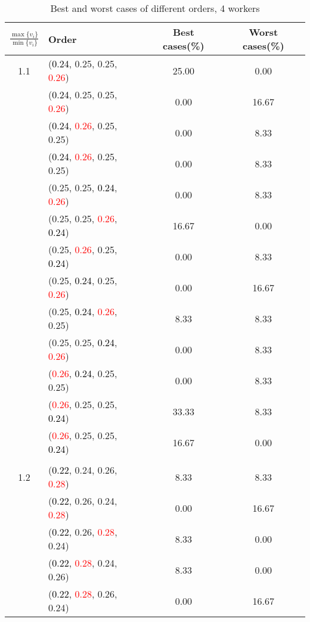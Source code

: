 \documentclass[10pt,a4paper]{report}
\begin{document}
\newpage\begin{center}
	\small
	\begin{longtable}{clcc}
		\caption{Best and worst cases of different orders, 4 workers}\\
		\toprule
		\setlength{\tabcolsep}{1mm}
		\renewcommand\baselinestretch{0.5}\selectfont
		$\frac{\max\{v_i\}}{\min\{v_i\}}$ & Order & Best cases(\%) & Worst cases(\%) \\
			\midrule		1.1			&(\textcolor{black}{0.24}, 0.25, 0.25, \textcolor{red}{0.26})&25.00&0.00\\
			&(\textcolor{black}{0.24}, 0.25, 0.25, \textcolor{red}{0.26})&0.00&16.67\\
			&(\textcolor{black}{0.24}, \textcolor{red}{0.26}, 0.25, 0.25)&0.00&8.33\\
			&(\textcolor{black}{0.24}, \textcolor{red}{0.26}, 0.25, 0.25)&0.00&8.33\\
			&(0.25, 0.25, \textcolor{black}{0.24}, \textcolor{red}{0.26})&0.00&8.33\\
			&(0.25, 0.25, \textcolor{red}{0.26}, \textcolor{black}{0.24})&16.67&0.00\\
			&(0.25, \textcolor{red}{0.26}, 0.25, \textcolor{black}{0.24})&0.00&8.33\\
			&(0.25, \textcolor{black}{0.24}, 0.25, \textcolor{red}{0.26})&0.00&16.67\\
			&(0.25, \textcolor{black}{0.24}, \textcolor{red}{0.26}, 0.25)&8.33&8.33\\
			&(0.25, 0.25, \textcolor{black}{0.24}, \textcolor{red}{0.26})&0.00&8.33\\
			&(\textcolor{red}{0.26}, \textcolor{black}{0.24}, 0.25, 0.25)&0.00&8.33\\
			&(\textcolor{red}{0.26}, 0.25, 0.25, \textcolor{black}{0.24})&33.33&8.33\\
			&(\textcolor{red}{0.26}, 0.25, 0.25, \textcolor{black}{0.24})&16.67&0.00\\
		&&&\\
		1.2			&(\textcolor{black}{0.22}, 0.24, 0.26, \textcolor{red}{0.28})&8.33&8.33\\
			&(\textcolor{black}{0.22}, 0.26, 0.24, \textcolor{red}{0.28})&0.00&16.67\\
			&(\textcolor{black}{0.22}, 0.26, \textcolor{red}{0.28}, 0.24)&8.33&0.00\\
			&(\textcolor{black}{0.22}, \textcolor{red}{0.28}, 0.24, 0.26)&8.33&0.00\\
			&(\textcolor{black}{0.22}, \textcolor{red}{0.28}, 0.26, 0.24)&0.00&16.67\\

\end{longtable}
\end{center}
\end{document}
